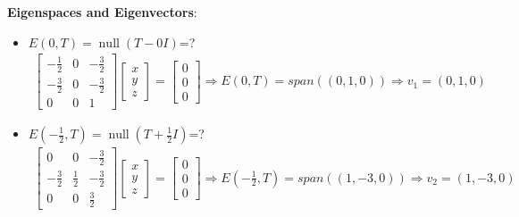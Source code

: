 \documentclass[12pt, letterpaper]{scrartcl}
\DeclareMathOperator{\Null}{null}
\begin{document}
\begin{enumerate}[(a)]
     \textbf{Eigenspaces and Eigenvectors}:
     \begin{itemize}
         \item $E(0,T)=\Null(T-0I)$=?
             \begin{align*}
                 \left[
                 \begin{array}{ccc}
                      -\frac{1}{2}&0&-\frac{3}{2}\\
                      -\frac{3}{2}&0&-\frac{3}{2}\\
                      0&0&1
                 \end{array}
                 \right]
                 \left[
                 \begin{array}{c}
                      x\\
                      y\\
                      z
                 \end{array}
                 \right]
                 =
                 \left[
                 \begin{array}{c}
                      0\\
                      0\\
                      0
                 \end{array}
                 \right]
                 \Longrightarrow
                 E(0,T)=span((0,1,0))
                 \Longrightarrow
                 v_1=(0,1,0)
             \end{align*}
        \item $E(-\frac{1}{2},T)=\Null(T+\frac{1}{2}I)$=?
             \begin{align*}
                 \left[
                 \begin{array}{ccc}
                      0&0&-\frac{3}{2}\\
                      -\frac{3}{2}&\frac{1}{2}&-\frac{3}{2}\\
                      0&0&\frac{3}{2}
                 \end{array}
                 \right]
                 \left[
                 \begin{array}{c}
                      x\\
                      y\\
                      z
                 \end{array}
                 \right]
                 =
                 \left[
                 \begin{array}{c}
                      0\\
                      0\\
                      0
                 \end{array}
                 \right]
                 \Longrightarrow
                 E(-\frac{1}{2},T)=span((1,-3,0))
                 \Longrightarrow
                 v_2=(1,-3,0)
             \end{align*}


\end{itemize}
\end{enumerate}
\end{document}
